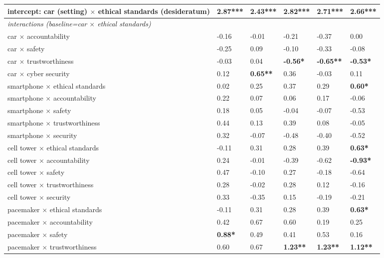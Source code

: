 \begin{table*}[htbp]
\begin{tabularx}{\linewidth}{XL{1.5cm}L{1.5cm}L{1.5cm}L{1.5cm}L{1.5cm}}
         \midrule
        intercept: car (setting) $\times$ ethical standards (desideratum) & 2.87*** & 2.43***  & 2.82***  & 2.71***  & 2.66*** \\
        \midrule
        \textit{interactions (baseline=car $\times$ ethical standards)}\\
        car $\times$ accountability & -0.16 & -0.01 &  -0.21 & -0.37  & 0.00 \\
        car $\times$ safety & -0.25 & 0.09 & -0.10 &  -0.33 & -0.08 \\
        car $\times$ trustworthiness & -0.03 & 0.04 & \textbf{-0.56*} & \textbf{-0.65**} & \textbf{-0.53*}\\
        car $\times$ cyber security & 0.12 &  \textbf{0.65**} & 0.36 & -0.03 & 0.11 \\
        smartphone $\times$ ethical standards & 0.02  & 0.25 & 0.37 & 0.29 & \textbf{0.60*}\\
        smartphone $\times$ accountability & 0.22 & 0.07 & 0.06  & 0.17 &  -0.06 \\
        smartphone $\times$ safety & 0.18  & 0.05 & -0.04 & -0.07 & -0.53\\
        smartphone $\times$ trustworthiness & 0.44  & 0.13  & 0.39  & 0.08 &  -0.05 \\
        smartphone $\times$ security & 0.32 & -0.07 & -0.48 & -0.40 & -0.52 \\
        cell tower $\times$ ethical standards & -0.11 & 0.31 & 0.28 & 0.39 & \textbf{0.63*} \\
        cell tower $\times$ accountability & 0.24 & -0.01 & -0.39 & -0.62 &  \textbf{-0.93*}\\
        cell tower $\times$ safety & 0.47 &  -0.10 & 0.27 & -0.18 & -0.64 \\
        cell tower $\times$ trustworthiness & 0.28 & -0.02 & 0.28 & 0.12 &  -0.16\\
        cell tower $\times$ security & 0.33 & -0.35 & 0.15 & -0.19  & -0.21 \\
        pacemaker $\times$ ethical standards & -0.11 & 0.31 & 0.28 & 0.39 & \textbf{0.63*} \\
        pacemaker $\times$ accountability & 0.42  & 0.67 & 0.60 & 0.19 & 0.25 \\
        pacemaker $\times$ safety & \textbf{0.88*} & 0.49 & 0.41 & 0.53  & 0.16 \\
        pacemaker $\times$ trustworthiness & 0.60 & 0.67 & \textbf{1.23**} & \textbf{1.23**} & \textbf{1.12**} \\

\end{tabularx}
\end{table*}
